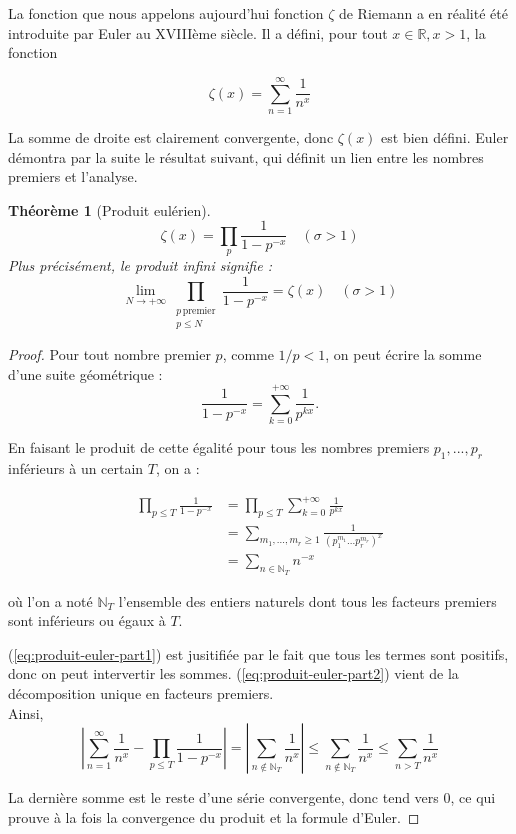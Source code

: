 \documentclass[french]{report}
\newtheorem{theorem}{Théorème}[section]
\begin{document}
La fonction que nous appelons aujourd'hui fonction $\zeta$ de Riemann a en réalité été introduite par Euler au XVIIIème siècle. Il a défini, pour tout $x\in\mathbb{R}, x>1$, la fonction

\[ \zeta(x) = \sum_{n=1}^{\infty}\frac{1}{n^x} \]

La somme de droite est clairement convergente, donc $\zeta(x)$ est bien défini. Euler démontra par la suite le résultat suivant, qui définit un lien entre les nombres premiers et l'analyse.

\begin{theorem}[Produit eulérien]\label{thm:produit-eulerien-reel}
  \[ \zeta(x) = \prod_p\frac{1}{1-p^{-x}}\quad(\sigma>1) \]
  Plus précisément, le produit infini signifie :
  \[ \lim_{N\to+\infty}\prod_{\substack{p\,\mathrm{premier}\\p\leq N}}\frac{1}{1-p^{-x}}=\zeta(x)\quad(\sigma>1) \]
\end{theorem}

\begin{proof}
  Pour tout nombre premier $p$, comme $1/p<1$, on peut écrire la somme d'une suite géométrique :
  \[ \frac{1}{1-p^{-x}}=\sum_{k=0}^{+\infty}\frac{1}{p^{kx}}. \]

  En faisant le produit de cette égalité pour tous les nombres premiers $p_1, ..., p_r$ inférieurs à un certain $T$, on a :
  
  \begin{align}
    \prod_{p\leq T}\frac{1}{1-p^{-x}}
    &= \prod_{p\leq T}\sum_{k=0}^{+\infty}\frac{1}{p^{kx}}  \\
    &= \sum_{m_1,...,m_r\geq1}\frac{1}{(p_1^{m_1}...p_r^{m_r})^x} \label{eq:produit-euler-part1} \\
    &= \sum_{n\in\mathbb{N}_T}n^{-x} \label{eq:produit-euler-part2}
  \end{align}

  où l'on a noté $\mathbb{N}_T$ l'ensemble des entiers naturels dont tous les facteurs premiers sont inférieurs ou égaux à $T$.

  (\ref{eq:produit-euler-part1}) est jusitifiée par le fait que tous les termes sont positifs, donc on peut intervertir les sommes. (\ref{eq:produit-euler-part2}) vient de la décomposition unique en facteurs premiers.
  \\

  Ainsi,
  \[ \left|\sum_{n=1}^{\infty}\frac{1}{n^x}-\prod_{p\leq T}\frac{1}{1-p^{-x}}\right|
  = \left|\sum_{n\notin\mathbb{N}_T}\frac{1}{n^x}\right|
  \leq \sum_{n\notin\mathbb{N}_T}\frac{1}{n^x}
  \leq \sum_{n>T}\frac{1}{n^x}
  \]

  La dernière somme est le reste d'une série convergente, donc tend vers 0, ce qui prouve à la fois la convergence du produit et la formule d'Euler.
\end{proof}
\end{document}
